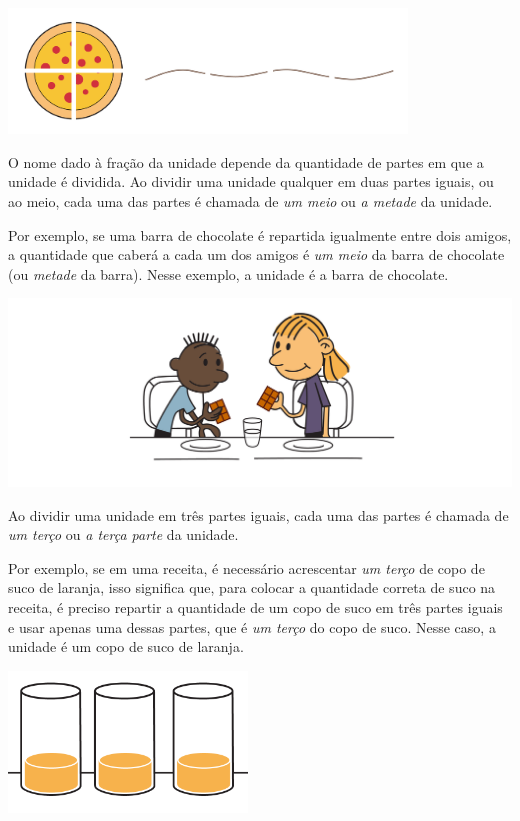 \begin{center}
    \includegraphics[width=300pt, keepaspectratio]{../figuras/licao01/orgideias_fig01.png}
  \end{center}

O nome dado à fração da unidade depende da quantidade de partes em que a unidade é dividida.
Ao dividir uma unidade qualquer em duas partes iguais, ou ao meio, cada uma das partes é chamada de \textit{um meio} ou \textit{a metade} da unidade.

Por exemplo, se uma barra de chocolate é repartida igualmente entre dois amigos, a quantidade que caberá a cada um dos amigos é \textit{um meio} da barra de chocolate (ou \textit{metade} da barra). Nesse exemplo, a unidade é a barra de chocolate.

\begin{center}
    \includegraphics[width=400pt, keepaspectratio]{../figuras/licao01/orgideias_fig02.png}
  \end{center}

Ao dividir uma unidade em três partes iguais, cada uma das partes é chamada de \textit{um terço} ou \textit{a terça parte} da unidade.

Por exemplo, se em uma receita, é necessário acrescentar \textit{um terço} de copo de suco de laranja, isso significa que, para colocar a quantidade correta de suco na receita, é preciso repartir a quantidade de um copo de suco em três partes iguais e usar apenas uma dessas partes, que é \textit{um terço} do copo de suco. Nesse caso, a unidade é um copo de suco de laranja.

\begin{center}
    \includegraphics[width=180pt, keepaspectratio]{../figuras/licao01/orgideias_fig03a.png}
  \end{center}

